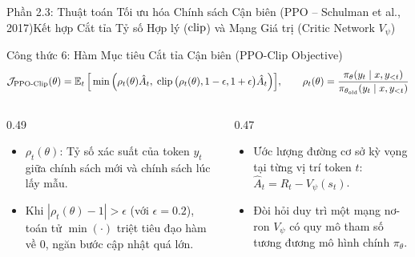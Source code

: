 \begin{frame}{Phần 2.3: Thuật toán Tối ưu hóa Chính sách Cận biên (PPO -- Schulman et al., 2017)}{Kết hợp Cắt tỉa Tỷ số Hợp lý ($\operatorname{\mathrm{clip}}$) và Mạng Giá trị (Critic Network $V_\psi$)}
  \begin{block}{Công thức 6: Hàm Mục tiêu Cắt tỉa Cận biên (PPO-Clip Objective)}
    \[
      \mathcal{J}_{\text{PPO-Clip}}(\theta) = \operatorname{\mathbb{E}}_{t} \Big[ \min \Big( \rho_t(\theta) \hat{A}_t, \; \operatorname{\mathrm{clip}}\big(\rho_t(\theta), 1 - \epsilon, 1 + \epsilon\big) \hat{A}_t \Big) \Big],
      \qquad \rho_t(\theta) = \frac{\pi_\theta(y_t \mid x, y_{<t})}{\pi_{\theta_{\text{old}}}(y_t \mid x, y_{<t})}
    \]
  \end{block}

  \begin{columns}[T,onlytextwidth]
    \begin{column}{0.49\textwidth}
      \footnotesize
      \begin{itemize}\setlength{\itemsep}{5pt}
        \item $\rho_t(\theta)$: Tỷ số xác suất của token $y_t$ giữa chính sách mới và chính sách lúc lấy mẫu.
        \item Khi $|\rho_t(\theta) - 1| > \epsilon$ (với $\epsilon = 0.2$), toán tử $\min(\cdot)$ triệt tiêu đạo hàm về $0$, ngăn bước cập nhật quá lớn.
      \end{itemize}
    \end{column}
    \begin{column}{0.47\textwidth}
      \footnotesize
      \begin{itemize}\setlength{\itemsep}{5pt}
        \item Ước lượng đường cơ sở kỳ vọng tại từng vị trí token $t$: $\hat{A}_t = R_t - V_\psi(s_t)$.
        \item Đòi hỏi duy trì một mạng nơ-ron $V_\psi$ có quy mô tham số tương đương mô hình chính $\pi_\theta$.
      \end{itemize}
    \end{column}
  \end{columns}
\end{frame}

